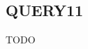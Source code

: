 \documentclass[letterpaper, 10 pt, conference]{IEEEtran}  %
\begin{document}
\subsection{QUERY11}

TODO














\addtolength{\textheight}{-12cm}   %










\end{document}
